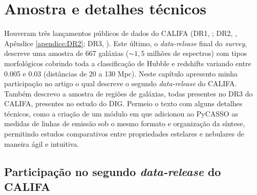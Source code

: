 
\chapter{Amostra e detalhes técnicos}
\label{sec:sample}

Houveram três lançamentos públicos de dados do CALIFA (DR1, \citealt{Husemann.etal.2013a}; DR2, \citealt{GarciaBenito.etal.2015a}, Apêndice \ref{apendice:DR2}; DR3, \citealt{SFSanchez.DR3.2016}). Este último, o {\em data-release} final do {\em survey}, descreve uma amostra de 667 galáxias ($\sim 1,5$ milhões de espectros) com tipos morfológicos cobrindo toda a classificação de Hubble e redshifts variando entre 0.005 e 0.03 (distâncias de 20 a 130 Mpc). Neste capítulo apresento minha participação no artigo \citep[][Apêndice \ref{apendice:GBetal2015a}]{GarciaBenito.etal.2015a} o qual descreve o segundo {\em data-release} do CALIFA. Também descrevo a amostra de regiões de galáxias, todas presentes no DR3 do CALIFA, presentes no estudo do DIG. Permeio o texto com alguns detalhes técnicos, como a criação de um módulo em \pyt que adicionou ao PyCASSO as medidas de linhas de emissão sob o mesmo formato e organização da síntese, permitindo estudos comparativos entre propriedades estelares e nebulares de maneira ágil e intuitiva.


\section{Participação no segundo {\em data-release} do CALIFA}
\label{sec:sample:DR2}

